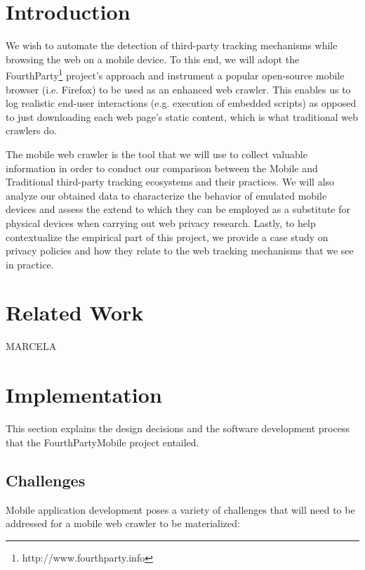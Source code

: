 \documentclass{acm_proc_article-sp}
\begin{document}


\section{Introduction}
We wish to automate the detection of third-party tracking mechanisms while browsing the web on a mobile device. To this end, we will adopt the FourthParty\footnote{http://www.fourthparty.info} project's approach and instrument a popular open-source mobile browser (i.e. Firefox) to be used as an enhanced web crawler. This enables us to log realistic end-user interactions (e.g. execution of embedded scripts) as opposed to just downloading each web page's static content, which is what traditional web crawlers do.

The mobile web crawler is the tool that we will use to collect valuable information in order to conduct our comparison between the Mobile and Traditional third-party tracking ecosystems and their practices. We will also analyze our obtained data to characterize the behavior of emulated mobile devices and assess the extend to which they can be employed as a substitute for physical devices when carrying out web privacy research. Lastly, to help contextualize the empirical part of this project, we provide a case study on privacy policies and how they relate to the web tracking mechanisms that we see in practice.

\section{Related Work}
MARCELA

\section{Implementation}
This section explains the design decisions and the software development process that the FourthPartyMobile project entailed.

\subsection{Challenges}
Mobile application development poses a variety of challenges that will need to be addressed for a mobile web crawler to be materialized:
\end{document}
